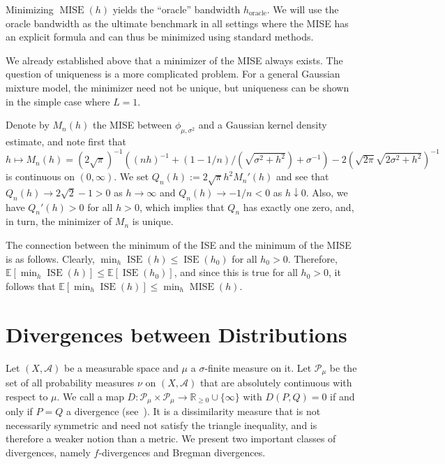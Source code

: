 Minimizing $\operatorname{MISE}(h)$ yields the \enquote{oracle} bandwidth $h_{\text{oracle}}$. We will use the oracle bandwidth as the ultimate benchmark in all settings where the MISE has an explicit formula and can thus be minimized using standard methods.

We already established above that a minimizer of the MISE always exists. The question of uniqueness is a more complicated problem. For a general Gaussian mixture model, the minimizer need not be unique, but uniqueness can be shown in the simple case where $L=1$. 

Denote by $M_n(h)$ the MISE between $\phi_{\mu,\sigma^2}$ and a Gaussian kernel density estimate, and note first that $h\mapsto M_n(h)=(2\sqrt{\pi})^{-1}((nh)^{-1}+(1-1/n)/(\sqrt{\sigma^2+h^2})+\sigma^{-1})-2(\sqrt{2\pi}\sqrt{2\sigma^2+h^2})^{-1}$ is continuous on $(0,\infty)$. We set $Q_n(h):=2\sqrt{\pi}h^2M_n'(h)$ and see that $Q_n(h)\to2\sqrt{2}-1>0$ as $h\to\infty$ and $Q_n(h)\to-1/n<0$ as $h\downarrow0$. Also, we have $Q_n'(h)>0$ for all $h>0$, which implies that $Q_n$ has exactly one zero, and, in turn, the minimizer of $M_n$ is unique.

\begingroup
\setlength{\emergencystretch}{1em}
The connection between the minimum of the ISE and the minimum of the MISE is as follows. Clearly, $\min_h\operatorname{ISE}(h)\le\operatorname{ISE}(h_0)$ for all $h_0>0$. Therefore, $\mathbb{E}[\min_h\operatorname{ISE}(h)]\le\mathbb{E}[\operatorname{ISE}(h_0)]$, and since this is true for all $h_0>0$, it follows that $\mathbb{E}[\min_h\operatorname{ISE}(h)]\le\min_h\operatorname{MISE}(h)$.
\par
\endgroup

\section{Divergences between Distributions}\label{sec:divergences}

Let $(X,\mathcal{A})$ be a measurable space and $\mu$ a $\sigma$-finite measure on it. Let $\mathcal{P}_{\mu}$ be the set of all probability measures $\nu$ on $(X,\mathcal{A})$ that are absolutely continuous with respect to $\mu$. We call a map $D:\mathcal{P}_{\mu}\times\mathcal{P}_{\mu}\to\mathbb{R}_{\ge0}\cup\{\infty\}$ with $D(P,Q)=0$ if and only if $P=Q$ a divergence (see~\cite[Section~2.1]{birrell_f_nodate}). It is a dissimilarity measure that is not necessarily symmetric and need not satisfy the triangle inequality, and is therefore a weaker notion than a metric. We present two important classes of divergences, namely $f$-divergences and Bregman divergences.


